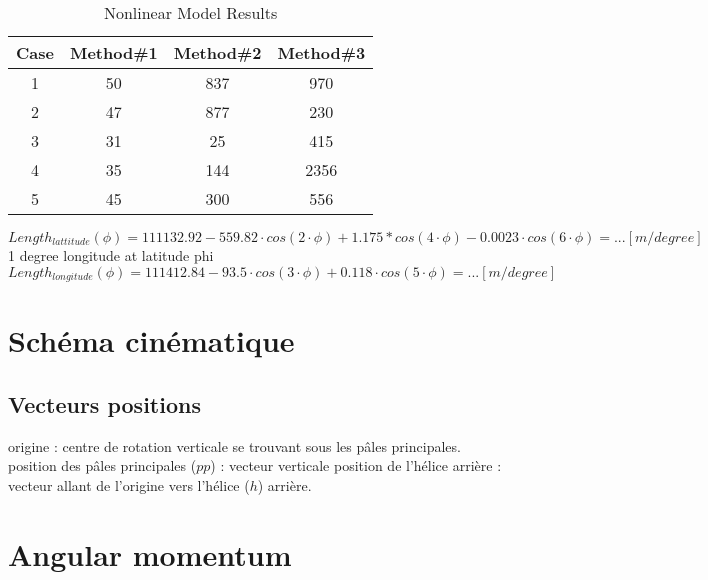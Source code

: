 \documentclass[12pt,a4paper]{article}
\begin{document}
\begin{table}[ht]
	\caption{Nonlinear Model Results} %
	\centering %
	\begin{tabular}{c c c c} %
		\hline\hline %
		Case & Method\#1 & Method\#2 & Method\#3 \\ [0.5ex] %
		\hline %
		1 & 50 & 837 & 970 \\ %
		2 & 47 & 877 & 230 \\
		3 & 31 & 25 & 415 \\
		4 & 35 & 144 & 2356 \\
		5 & 45 & 300 & 556 \\ [1ex] %
		\hline %
	\end{tabular}\label{table:nonlin} %
\end{table}



\begin{equation}
	Length_{lattitude}(\phi) = 111132.92-559.82 \cdot cos(2 \cdot \phi)+1.175*cos(4 \cdot \phi)-0.0023 \cdot cos(6 \cdot \phi)= ... [m/degree]
\end{equation}
 1 degree longitude at latitude phi
\begin{equation}
	Length_{longitude}(\phi) =
	111412.84-93.5 \cdot cos(3 \cdot \phi)+ 0.118 \cdot cos(5 \cdot \phi)= ... [m/degree]
\end{equation}

\newpage
\section{Schéma cinématique}


\subsection{Vecteurs positions}
origine : centre de rotation verticale se trouvant sous les pâles principales.
\medbreak
position  des pâles principales ($pp$) : vecteur verticale
\medbreak
position de l'hélice arrière : 
vecteur allant de l'origine vers l'hélice ($h$) arrière. 


\newpage
\section{Angular momentum}
\end{document}
